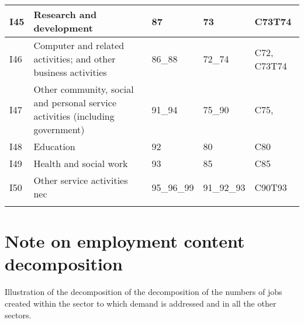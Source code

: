 \documentclass[12pt,english]{article}
\newcommand\lies[2][]{\todo[color=orange!50,#1]{ldf: #2}}
\begin{document}
\begin{table}[ht]
\begin{adjustbox}{width=\textwidth}
\begin{tabular}{lp{500pt}lll}
		I45 & Research and development  & 87 & 73 & C73T74 \\ \midrule
		I46 & Computer and related activities; and other business activities & 86\_88 & 72\_74 & C72, C73T74 \\ \midrule
		I47 & Other community, social and personal service activities (including government) & 91\_94 & 75\_90 & C75,  \\ \midrule
		I48 & Education & 92 & 80 & C80 \\ \midrule
		I49 & Health and social work & 93 & 85 & C85 \\ \midrule
		I50 & Other service activities nec & 95\_96\_99 & 91\_92\_93 & C90T93 \\
		\arrayrulecolor{black}\bottomrule	
	\end{tabular}
	\end{adjustbox}
	\thispagestyle{empty}
\end{table}

\clearpage
\section{Note on employment content decomposition}

Illustration of the decomposition of the decomposition of the numbers of jobs created within the sector to which demand is addressed and in all the other sectors.\lies{TODO}
\end{document}
